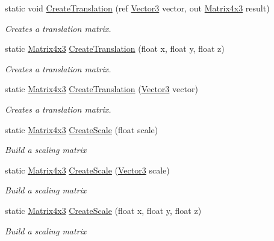 \begin{DoxyCompactItemize}
static void \hyperlink{struct_open_t_k_1_1_matrix4x3_a4857c54a5c43e71c106b209f07c93ec0}{Create\-Translation} (ref \hyperlink{struct_open_t_k_1_1_vector3}{Vector3} vector, out \hyperlink{struct_open_t_k_1_1_matrix4x3}{Matrix4x3} result)
\begin{DoxyCompactList}\small\item\em Creates a translation matrix. \end{DoxyCompactList}\item 
static \hyperlink{struct_open_t_k_1_1_matrix4x3}{Matrix4x3} \hyperlink{struct_open_t_k_1_1_matrix4x3_a73b1ff35a86f58376348f1d48b987d69}{Create\-Translation} (float x, float y, float z)
\begin{DoxyCompactList}\small\item\em Creates a translation matrix. \end{DoxyCompactList}\item 
static \hyperlink{struct_open_t_k_1_1_matrix4x3}{Matrix4x3} \hyperlink{struct_open_t_k_1_1_matrix4x3_a6afb89be3d4add0308a6fbcd7ac289c4}{Create\-Translation} (\hyperlink{struct_open_t_k_1_1_vector3}{Vector3} vector)
\begin{DoxyCompactList}\small\item\em Creates a translation matrix. \end{DoxyCompactList}\item 
static \hyperlink{struct_open_t_k_1_1_matrix4x3}{Matrix4x3} \hyperlink{struct_open_t_k_1_1_matrix4x3_a78497af222d446d6058c0edeb467d0a2}{Create\-Scale} (float scale)
\begin{DoxyCompactList}\small\item\em Build a scaling matrix \end{DoxyCompactList}\item 
static \hyperlink{struct_open_t_k_1_1_matrix4x3}{Matrix4x3} \hyperlink{struct_open_t_k_1_1_matrix4x3_ab1e74e29022ae22ce2631731dbe54edb}{Create\-Scale} (\hyperlink{struct_open_t_k_1_1_vector3}{Vector3} scale)
\begin{DoxyCompactList}\small\item\em Build a scaling matrix \end{DoxyCompactList}\item 
static \hyperlink{struct_open_t_k_1_1_matrix4x3}{Matrix4x3} \hyperlink{struct_open_t_k_1_1_matrix4x3_a9acf792d3229f29124d19a76aef14e53}{Create\-Scale} (float x, float y, float z)
\begin{DoxyCompactList}\small\item\em Build a scaling matrix \end{DoxyCompactList}\item 

\end{DoxyCompactItemize}
